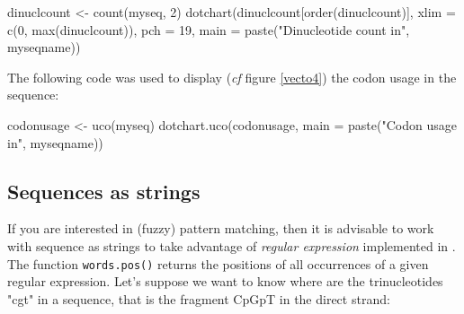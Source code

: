 \documentclass{article}
\begin{document}
\begin{figure}
\centering{}
\end{figure}

\begin{Schunk}
\begin{Sinput}
 dinuclcount <- count(myseq, 2)
 dotchart(dinuclcount[order(dinuclcount)], xlim = c(0, max(dinuclcount)), 
     pch = 19, main = paste("Dinucleotide count in", myseqname))
\end{Sinput}
\end{Schunk}

The following code was used to display (\textit{cf} figure \ref{vecto4}) 
the codon usage in the sequence:

\begin{figure}
\centering{}
\end{figure}

\begin{Schunk}
\begin{Sinput}
 codonusage <- uco(myseq)
 dotchart.uco(codonusage, main = paste("Codon usage in", myseqname))
\end{Sinput}
\end{Schunk}

\clearpage

\subsection{Sequences as strings}

If you are interested in (fuzzy) pattern matching, then it is advisable to work with
sequence as strings to take advantage of \emph{regular expression} implemented
in \Rlogo{}. The function \texttt{words.pos()} returns the positions of all occurrences
of a given regular expression. Let's suppose we want to know where are the trinucleotides
"cgt" in a sequence, that is the fragment CpGpT in the direct strand:
\end{document}
